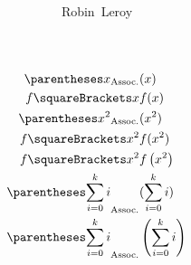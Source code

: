 \documentclass[10pt, a4paper, twoside]{basestyle}
\title{%
\textdisplay{%
Parenthetical madness%
}%
}
\author{Robin~Leroy}
\begin{document}
\begin{align*}
\pa{x}&(x) \\
f\of x & f(x) \\
\pa{x^2}&(x^2) \\
f\of {x^2} & f(x^2) \\
f\of {x^2} & f\left(x^2\right) \\
\pa{\sum {i=0}[k] i} & (\sum {i=0}[k] i) \\
\pa{\sum {i=0}[k] i} & \left(\sum {i=0}[k] i\right) \\
\end{align*}
\end{document}
